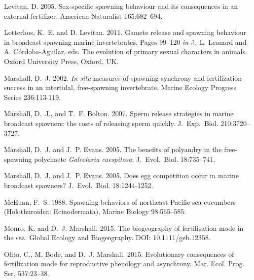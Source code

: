 \documentclass{article}
\begin{document}
\begin{thebibliography}{}
Levitan, D. 2005.
\newblock Sex-specific spawning behaviour and its consequences in an external fertilizer.
\newblock American Naturalist 165:682--694.

Lotterhos, K.~E. and D. Levitan. 2011.
\newblock Gamete release and spawning behaviour in broadcast spawning marine invertebrates.
\newblock Pages 99--120 \emph{in} J.~L. Leonard and A. C\'{o}rdoba-Aguilar, eds. The evolution of primary sexual characters in animals. Oxford University Press, Oxford, UK.

Marshall, D.~J. 2002.
\newblock \textit{In situ} measures of spawning synchrony and fertilization success in an intertidal, free-spawning invertebrate.
\newblock Marine Ecology Progress Series 236:113-119.

Marshall, D.~J., and T.~F. Bolton. 2007.
\newblock Sperm release strategies in marine broadcast spawners: the costs of releasing sperm quickly.
\newblock J.~Exp.~Biol. 210:3720--3727.

Marshall, D.~J. and J.~P. Evans. 2005.
\newblock The benefits of polyandry in the free-spawning polychaete \textit{Galeolaria caespitosa}.
\newblock J.~Evol.~Biol. 18:735--741.

Marshall, D.~J. and J.~P. Evans. 2005.
\newblock Does egg competition occur in marine broadcast spawners? 
\newblock J.~Evol.~Biol. 18:1244-1252.

McEuan, F.~S. 1988.
\newblock Spawning behaviors of northeast Pacific sea cucumbers (Holothuroidea: Ecinodermata).
\newblock Marine Biology 98:565--585.

Monro, K. and D.~J. Marshall. 2015.
\newblock The biogeography of fertilisation mode in the sea.
\newblock Global Ecology and Biogeography. DOI: 10.1111/geb.12358.

Olito, C., M. Bode, and D.~J. Marshall. 2015.
\newblock Evolutionary consequences of fertilization mode for reproductive phenology and asynchrony.
\newblock Mar. Ecol. Prog. Ser. 537:23--38.


\end{thebibliography}
\end{document}
